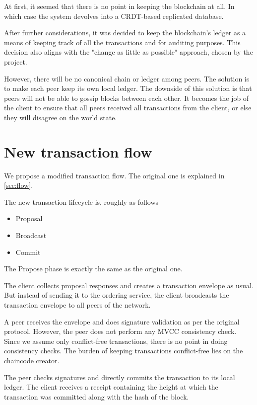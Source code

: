 At first, it seemed that there is no point in keeping the blockchain at all. In which case the system devolves into a CRDT-based replicated database.

After further considerations, it was decided to keep the blockchain's ledger as a means of keeping track of all the transactions and for auditing purposes. This decision also aligns with the "change as little as possible" approach, chosen by the project.

However, there will be no canonical chain or ledger among peers. The solution is to make each peer keep its own local ledger. The downside of this solution is that peers will not be able to gossip blocks between each other. It becomes the job of the client to ensure that all peers received all transactions from the client, or else they will disagree on the world state.

\section{New transaction flow}
\label{sec:app-flow}

We propose a modified transaction flow. The original one is explained in \ref{sec:flow}.

The new transaction lifecycle is, roughly as follows

\begin{itemize}
  \item Proposal
  \item Broadcast
  \item Commit
\end{itemize}

The Propose phase is exactly the same as the original one.

The client collects proposal responses and creates a transaction envelope as usual.  But instead of sending it to the ordering service, the client broadcasts the transaction envelope to all peers of the network.

A peer receives the envelope and does signature validation as per the original protocol. However, the peer does not perform any MVCC consistency check. Since we assume only conflict-free transactions, there is no point in doing consistency checks. The burden of keeping transactions conflict-free lies on the chaincode creator.

The peer checks signatures and directly commits the transaction to its local ledger. The client receives a receipt containing the height at which the transaction was committed along with the hash of the block.

